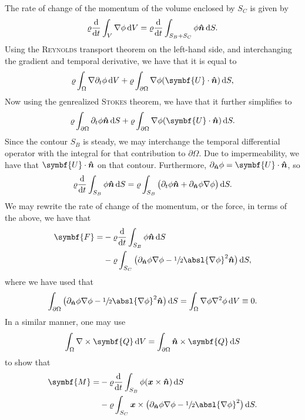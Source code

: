 The rate of change of the momentum of the volume enclosed by $S_C$ is given by
\[
    \varrho \frac{\mathrm{d}}{\mathrm{d} t}\int_{V} \nabla\phi \,\mathrm{d} V = \varrho \frac{\mathrm{d}}{\mathrm{d} t}\int_{S_B + S_C} \phi \bm{\hat{n}} \,\mathrm{d} S.
\]
Using the \textsc{Reynolds} transport theorem on the left-hand side, and interchanging the gradient and temporal derivative, we have that it is equal to
\[
    \varrho \int_{\Omega} \nabla\deet\phi \,\dee V + \varrho \int_{\partial\Omega} \nabla\phi (\symbf{U} \cdot \nhat) \,\dee S,
\]
Now using the genrealized \textsc{Stokes} theorem, we have that it further simplifies to
\[
    \varrho \int_{\partial\Omega} \deet \phi \nhat \,\dee S + \varrho \int_{\partial\Omega} \nabla\phi (\symbf{U} \cdot \nhat) \,\dee S.
\]
Since the contour $S_B$ is steady, we may interchange the temporal differential operator with the integral for that contribution to $\partial\Omega$.
Due to impermeability, we have that $\symbf{U} \cdot \nhat$ on that contour.
Furthermore, $\partial_{\nhat} \phi = \symbf{U} \cdot \nhat$, so
\[
    \varrho \frac{\mathrm{d}}{\mathrm{d} t} \int_{S_B} \phi \bm{\hat{n}} \,\mathrm{d} S = \varrho \int_{S_B} \big( \partial_t\phi\bm{\hat{n}} + \partial_{\bm{\hat{n}}} \phi \nabla\phi \big) \,\mathrm{d} S.
\]
We may rewrite the rate of change of the momentum, or the force, in terms of the above, we have that
\begin{equation*}
    \begin{aligned}
        \symbf{F} = & - \varrho \frac{\dee}{\dee t} \int_{S_B} \phi \nhat \,\dee S\\
        & - \varrho\int_{S_C} \big( \partial_{\nhat} \phi \nabla\phi - \sfrac{1}{2}\absl{\nabla \phi}^2 \nhat \big) \,\dee S,
    \end{aligned}
\end{equation*}
where we have used that
\[
    \int_{\partial\Omega} \big( \partial_{\nhat}\phi \nabla\phi - \sfrac{1}{2}\absl{\nabla \phi}^2 \nhat \big) \,\dee S = \int_{\Omega} \nabla\phi \nabla^2 \phi \,\dee V \equiv 0.
\]
In a similar manner, one may use
\[
    \int_{\Omega} \nabla\times\symbf{Q} \,\dee V = \int_{\partial\Omega} \nhat\times\symbf{Q} \,\dee S
\]
to show that
\begin{equation*}
    \begin{aligned}
        \symbf{M} = & - \varrho \frac{\dee}{\dee t}\int_{S_B} \phi (\xvec\times\nhat) \,\dee S\\
        & - \varrho \int_{S_C} \xvec\times \big( \partial_{\nhat} \phi \nabla\phi - \sfrac{1}{2}{\absl{\nabla\phi}}^2 \big) \,\dee S.
    \end{aligned}
\end{equation*}